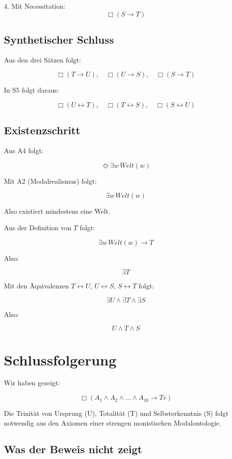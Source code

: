 \documentclass[
]{article}
\begin{document}
4. Mit Necessitation:  
   \[
   \boxed{\Box(S \rightarrow T)}
   \]

\subsection{Synthetischer Schluss}\label{synthetischer-schluss}

Aus den drei Sätzen folgt:

\[
\Box(T \rightarrow U), \quad \Box(U \rightarrow S), \quad \Box(S \rightarrow T)
\]

In S5 folgt daraus:

\[
\Box(U \leftrightarrow T), \quad \Box(T \leftrightarrow S), \quad \Box(S \leftrightarrow U)
\]

\subsection{Existenzschritt}\label{existenzschritt}

Aus A4 folgt:

\[
\Diamond\exists w\, Welt(w)
\]

Mit A2 (Modalrealismus) folgt:

\[
\exists w\, Welt(w)
\]

Also existiert mindestens eine Welt.

Aus der Definition von \(T\) folgt:

\[
\exists w\, Welt(w) \rightarrow T
\]

Also:

\[
\exists T
\]

Mit den Äquivalenzen \(T \leftrightarrow U\), \(U \leftrightarrow S\), \(S \leftrightarrow T\) folgt:

\[
\exists U \land \exists T \land \exists S
\]

Also:

\[
\boxed{U \land T \land S}
\]

\section{Schlussfolgerung}\label{schlussfolgerung}

Wir haben gezeigt:

\[
\boxed{\Box(A_1 \land A_2 \land ... \land A_{10} \rightarrow Tr)}
\]

Die Trinität von Ursprung (U), Totalität (T) und Selbsterkenntnis (S) folgt notwendig aus den Axiomen einer strengen monistischen Modalontologie.

\subsection{Was der Beweis nicht zeigt}\label{was-der-beweis-nicht-zeigt}
\end{document}
